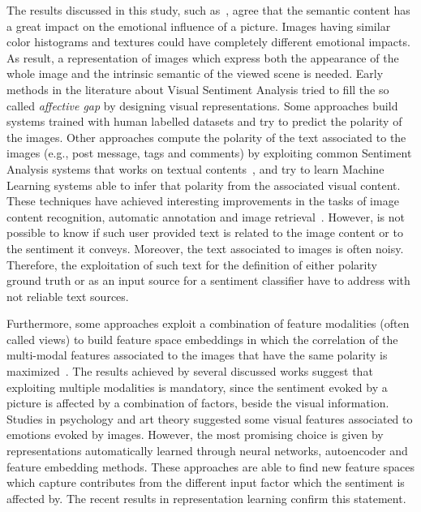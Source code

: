 The results discussed in this study, such as~\cite{machajdik2010affective}, agree that the semantic content has a great impact on the emotional influence of a picture. Images having similar color histograms and textures could have completely different emotional impacts.
As result, a representation of images which express both the appearance of the whole image and the intrinsic semantic of the viewed scene is needed.
Early methods in the literature about Visual Sentiment Analysis tried to fill the so called \textit{affective gap} by designing visual representations. Some approaches build systems trained with human labelled datasets and try to predict the polarity of the images.
Other approaches compute the polarity of the text associated to the images (e.g., post message, tags and comments) by exploiting common Sentiment Analysis systems that works on textual contents~\cite{esuli2006sentiwordnet, wilson2005recognizing}, and try to learn Machine Learning systems able to infer that polarity from the associated visual content.
These techniques have achieved interesting improvements in the tasks of image content recognition, automatic annotation and image retrieval~\cite{fu2014transductive, gong2014multi, gong2014improving,  guillaumin2010multimodal,   katsurai2014cross, li2015robust, rasiwasia2010new}.
However, is not possible to know if such user provided text is related to the image content or to the sentiment it conveys. Moreover, the text associated to images is often noisy. Therefore, the exploitation of such text for the definition of either polarity ground truth or as an input source for a sentiment classifier have to address with not reliable text sources.

Furthermore, some approaches exploit a combination of feature modalities (often called views) to build feature space embeddings in which the correlation of the multi-modal features associated to the images that have the same polarity is maximized~\cite{katsurai2016image}.
The results achieved by several discussed works suggest that exploiting multiple modalities is mandatory, since the sentiment evoked by a picture is affected by a combination of factors, beside the visual information.
Studies in psychology and art theory suggested some visual features associated to emotions evoked by images. However, the most promising choice is given by representations automatically learned through neural networks, autoencoder and feature embedding methods. These approaches are able to find new feature spaces which capture contributes from the different input factor which the sentiment is affected by. The recent results in representation learning confirm this statement.

